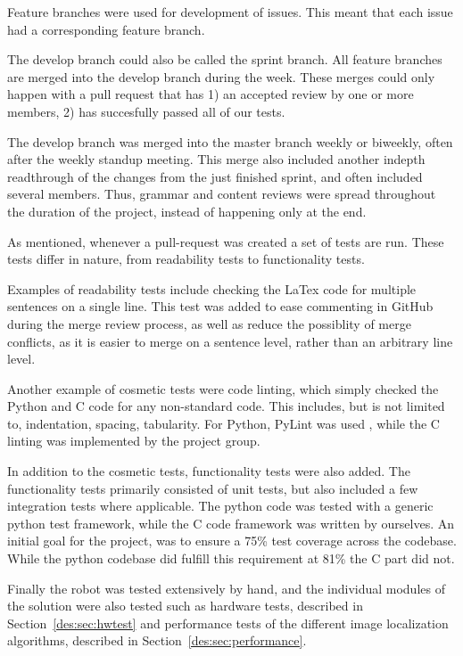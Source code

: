 Feature branches were used for development of issues.
This meant that each issue had a corresponding feature branch.

The develop branch could also be called the sprint branch.
All feature branches are merged into the develop branch during the week.
These merges could only happen with a pull request that has 1) an accepted review by one or more members, 2) has succesfully passed all of our tests.

The develop branch was merged into the master branch weekly or biweekly, often after the weekly standup meeting.
This merge also included another indepth readthrough of the changes from the just finished sprint, and often included several members.
Thus, grammar and content reviews were spread throughout the duration of the project, instead of happening only at the end.

As mentioned, whenever a pull-request was created a set of tests are run.
These tests differ in nature, from readability tests to functionality tests.

Examples of readability tests include checking the LaTex code for multiple sentences on a single line.
This test was added to ease commenting in GitHub during the merge review process, as well as reduce the possiblity of merge conflicts, as it is easier to merge on a sentence level, rather than an arbitrary line level.

Another example of cosmetic tests were code linting, which simply checked the Python and C code for any non-standard code.
This includes, but is not limited to, indentation, spacing, tabularity.
For Python, PyLint was used , while the C linting was implemented by the project group.

In addition to the cosmetic tests, functionality tests were also added.
The functionality tests primarily consisted of unit tests, but also included a few integration tests where applicable.
The python code was tested with  a generic python test framework, while the C code framework was written by ourselves.
An initial goal for the project, was to ensure a 75\% test coverage across the codebase.
While the python codebase did fulfill this requirement at 81\% the C part did not.

Finally the robot was tested extensively by hand, and the individual modules of the solution were also tested such as hardware tests, described in Section~\ref{des:sec:hwtest} and performance tests of the different image localization algorithms, described in Section~\ref{des:sec:performance}.
